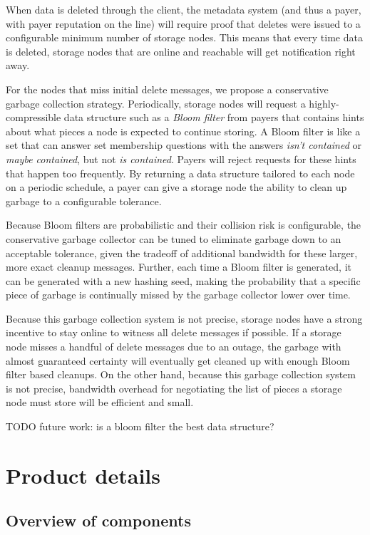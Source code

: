 \documentclass[a4paper,10pt]{article} \usepackage[utf8]{inputenc}
\newcommand{\todo}[1]{{\color{red} TODO #1 }}
\begin{document}
When data is deleted through the client, the metadata system (and thus a payer,
with payer reputation on the line) will require proof that deletes were issued
to a configurable minimum number of storage nodes. This means that every time
data is deleted, storage nodes that are online and reachable will get
notification right away.

For the nodes that miss initial delete messages, we propose a conservative
garbage collection strategy. Periodically, storage nodes will request
a highly-compressible data structure such as a
{\em Bloom filter} \cite{bloom-filter} from payers that contains hints about
what pieces a node is expected to continue storing.
A Bloom filter is like a set that can
answer set membership questions with the answers {\em isn't contained} or
{\em maybe contained}, but not {\em is contained}. Payers will reject
requests for these hints that happen too frequently. By returning a data
structure tailored to each node on a periodic schedule, a payer can give a
storage node the ability to clean up garbage to a configurable tolerance.

Because Bloom filters are probabilistic and their collision risk is
configurable, the conservative garbage collector can be tuned to eliminate
garbage down to an acceptable tolerance, given the tradeoff of additional
bandwidth for these larger, more exact cleanup messages. Further, each time a
Bloom filter is generated, it can be generated with a new hashing seed, making
the probability that a specific piece of garbage is continually missed by the
garbage collector lower over time.

Because this garbage collection system is not precise, storage nodes have a
strong incentive to stay online to witness all delete messages if possible.
If a storage node misses a handful of delete messages due to an outage, the
garbage with almost guaranteed certainty will eventually get cleaned up with
enough Bloom filter based cleanups.
On the other hand, because this garbage collection system is not precise,
bandwidth overhead for negotiating the list of pieces a storage node must store
will be efficient and small.

\todo{future work: is a bloom filter the best data structure?}

\section{Product details}\label{sec:product_details}

\subsection{Overview of components}
\end{document}
